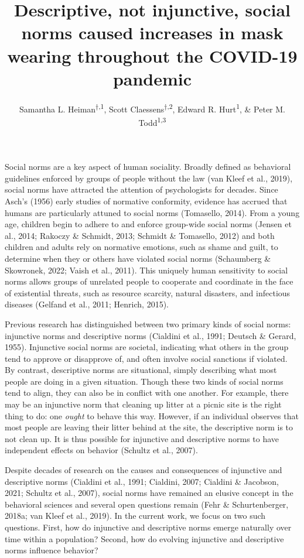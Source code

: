 \documentclass[
  english,
  man,floatsintext]{apa6}
\title{Descriptive, not injunctive, social norms caused increases in mask wearing throughout the COVID-19 pandemic}
\author{Samantha L. Heiman\textsuperscript{$\dagger{}$,1}, Scott Claessens\textsuperscript{$\dagger{}$,2}, Edward R. Hurt\textsuperscript{1}, \& Peter M. Todd\textsuperscript{1,3}}
\date{}
\affiliation{\vspace{0.5cm}\textsuperscript{1} Department of Psychological and Brain Sciences, Indiana University Bloomington, United States\\\textsuperscript{2} School of Psychology, University of Auckland, New Zealand\\\textsuperscript{3} Cognitive Science Program, Indiana University Bloomington, United States}
\begin{document}
\maketitle

Social norms are a key aspect of human sociality. Broadly defined as behavioral guidelines enforced by groups of people without the law (van Kleef et al., 2019), social norms have attracted the attention of psychologists for decades. Since Asch's (1956) early studies of normative conformity, evidence has accrued that humans are particularly attuned to social norms (Tomasello, 2014). From a young age, children begin to adhere to and enforce group-wide social norms (Jensen et al., 2014; Rakoczy \& Schmidt, 2013; Schmidt \& Tomasello, 2012) and both children and adults rely on normative emotions, such as shame and guilt, to determine when they or others have violated social norms (Schaumberg \& Skowronek, 2022; Vaish et al., 2011). This uniquely human sensitivity to social norms allows groups of unrelated people to cooperate and coordinate in the face of existential threats, such as resource scarcity, natural disasters, and infectious diseases (Gelfand et al., 2011; Henrich, 2015).

Previous research has distinguished between two primary kinds of social norms: injunctive norms and descriptive norms (Cialdini et al., 1991; Deutsch \& Gerard, 1955). Injunctive social norms are societal, indicating what others in the group tend to approve or disapprove of, and often involve social sanctions if violated. By contrast, descriptive norms are situational, simply describing what most people are doing in a given situation. Though these two kinds of social norms tend to align, they can also be in conflict with one another. For example, there may be an injunctive norm that cleaning up litter at a picnic site is the right thing to do: one \emph{ought} to behave this way. However, if an individual observes that most people are leaving their litter behind at the site, the descriptive norm is to not clean up. It is thus possible for injunctive and descriptive norms to have independent effects on behavior (Schultz et al., 2007).

Despite decades of research on the causes and consequences of injunctive and descriptive norms (Cialdini et al., 1991; Cialdini, 2007; Cialdini \& Jacobson, 2021; Schultz et al., 2007), social norms have remained an elusive concept in the behavioral sciences and several open questions remain (Fehr \& Schurtenberger, 2018a; van Kleef et al., 2019). In the current work, we focus on two such questions. First, how do injunctive and descriptive norms emerge naturally over time within a population? Second, how do evolving injunctive and descriptive norms influence behavior?
\end{document}
